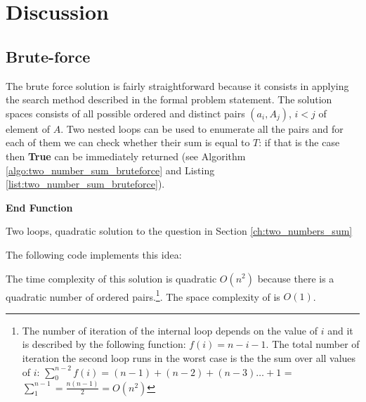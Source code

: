 \section{Discussion}

\subsection{Brute-force}
The brute force solution is fairly straightforward because it consists in applying the search method described in the formal problem statement. The solution spaces consists of all possible ordered and distinct pairs $(a_i,A_j)$, $i < j$ of element of $A$. Two nested loops can be used to enumerate all the pairs and for each of them we can check whether their sum is equal to $T$: if that is the case then   \textbf{True} can be immediately returned (see Algorithm \ref{algo:two_number_sum_bruteforce} and Listing \ref{list:two_number_sum_bruteforce}).

\begin{algorithm}
	\SetAlgoLined
	

	\textbf{End Function}
	
	\label{algo:two_number_sum_bruteforce}
	\caption{Two loops, quadratic solution to the question in Section \ref{ch:two_numbers_sum} }
\end{algorithm}
The following code implements this idea:



The time complexity of this solution is quadratic $O(n^2)$ because there is a quadratic number of ordered pairs.\footnote{The number of iteration of the internal loop depends on the value of $i$ and it is described by the following function: $f(i) = n-i-1$. The total number of iteration the second loop runs in the worst case is the the sum over all values of $i$: $\sum_{0}^{n-2}f(i) = (n-1) + (n-2) + (n-3) \dots + 1$ = $\sum_{1}^{n-1} = \frac{n(n-1)}{2} = O(n^2)$}. The space complexity of is $O(1)$.

